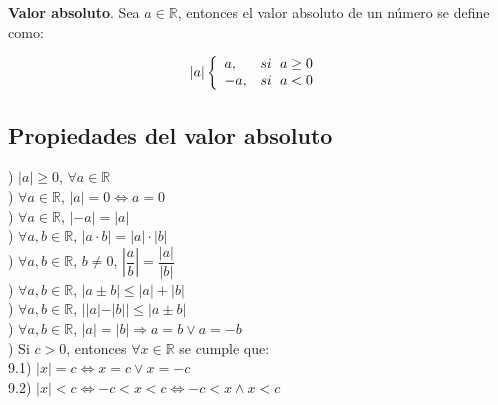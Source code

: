 \begin{mydef}
\textbf{Valor absoluto}. Sea $a\in\mathbb{R}$, entonces el valor absoluto de un número se define como:\

$$ |a| \left\{\begin{array}{ll}
a, & si \hspace{6px} a\geq 0\\
-a, & si \hspace{6px} a<0 
\end{array} \hspace{6px} \right.$$
\label{absdef}
\end{mydef}

\subsection{Propiedades del valor absoluto}
\label{Propabs}
) $|a|\geq 0$, $\forall a\in\mathbb{R}$ \\

) $\forall a\in\mathbb{R}$, $|a|=0\Leftrightarrow a=0$ \\

) $\forall a\in\mathbb{R}$, $|-a|=|a|$ \\

) $\forall a,b\in\mathbb{R}$, $|a\cdot b|=|a|\cdot|b|$ \\

) $\forall a,b\in\mathbb{R}$, $b\neq 0$, $\left|\dfrac{a}{b}\right|=\dfrac{|a|}{|b|}$ \\

) $\forall a,b\in\mathbb{R}$, $|a \pm b|\leq |a|+|b|$ \\

) $\forall a,b\in\mathbb{R}$, $||a|-|b||\leq |a\pm b|$ \\

) $\forall a,b\in\mathbb{R}$, $|a|=|b|\Rightarrow a=b \vee a= -b$ \\

) Si $c>0$, entonces $\forall x\in\mathbb{R}$ se cumple que:\\

9.1) $|x|=c\Leftrightarrow x=c \vee x=-c$ \\

9.2) $|x|<c\Leftrightarrow -c<x<c \Leftrightarrow -c<x\wedge x<c$\\

